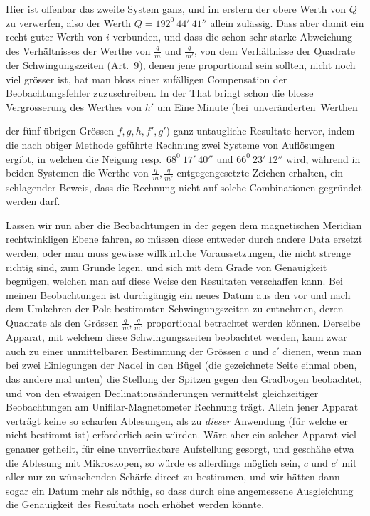 Hier ist offenbar das zweite System ganz, und im erstern der obere Werth von $Q$ zu verwerfen, also der Werth $Q=192^0\ 44'\ 41''$ allein zulässig. Dass aber damit ein recht guter Werth von $i$ verbunden, und dass die schon sehr starke Abweichung des Verhältnisses der Werthe von $\frac{q}{m}$ und $\frac{q}{m'}$, von dem Verhältnisse der Quadrate der Schwingungszeiten (Art.\ 9), denen jene proportional sein sollten, nicht noch viel grösser ist, hat man bloss einer zufälligen Compensation der Beobachtungsfehler zuzuschreiben. In der That bringt schon die blosse Vergrösserung des Werthes von $h'$ um Eine Minute \mbox{(bei unveränderten Werthen}
\par\clearpage
{}
\noindent der fünf übrigen Grössen $f,g,h,f',g'$) ganz untaugliche Resultate hervor, indem die nach obiger Methode geführte Rechnung zwei Systeme von Auflösungen ergibt, in welchen die Neigung resp.\ $68^0\ 17'\ 40''$ und $66^0\ 23'\ 12''$ wird, während in beiden Systemen die Werthe von $\frac{q}{m},\frac{q}{m'}$ entgegengesetzte Zeichen erhalten, ein schlagender Beweis, dass die Rechnung nicht auf solche Combinationen gegründet werden darf.

Lassen wir nun aber die Beobachtungen in der gegen dem magnetischen Meridian rechtwinkligen Ebene fahren, so müssen diese entweder durch andere Data ersetzt werden, oder man muss gewisse willkürliche Voraussetzungen, die nicht strenge richtig sind, zum Grunde legen, und sich mit dem Grade von Genauigkeit begnügen, welchen man auf diese Weise den Resultaten verschaffen kann. Bei meinen Beobachtungen ist durchgängig ein neues Datum aus den vor und nach dem Umkehren der Pole bestimmten Schwingungszeiten zu entnehmen, deren Quadrate als den Grössen $\frac{q}{m},\frac{q}{m'}$ proportional betrachtet werden können. Derselbe Apparat, mit welchem diese Schwingungszeiten beobachtet werden, kann zwar auch zu einer unmittelbaren Bestimmung der Grössen $c$ und $c'$ dienen, wenn man bei zwei Einlegungen der Nadel in den Bügel (die gezeichnete Seite einmal oben, das andere mal unten) die Stellung der Spitzen gegen den Gradbogen beobachtet, und von den etwaigen Declinationsänderungen vermittelst gleichzeitiger Beobachtungen am Unifilar-Magnetometer Rechnung trägt. Allein jener Apparat verträgt keine so scharfen Ablesungen, als zu \textit{dieser} Anwendung (für welche er nicht bestimmt ist) erforderlich sein würden. Wäre aber ein solcher Apparat viel genauer getheilt, für eine unverrückbare Aufstellung gesorgt, und geschähe etwa die Ablesung mit Mikroskopen, so würde es allerdings möglich sein, $c$ und $c'$ mit aller nur zu wünschenden Schärfe direct zu bestimmen, und wir hätten dann sogar ein Datum mehr als nöthig, so dass durch eine angemessene Ausgleichung die Genauigkeit des Resultats noch erhöhet werden könnte.

